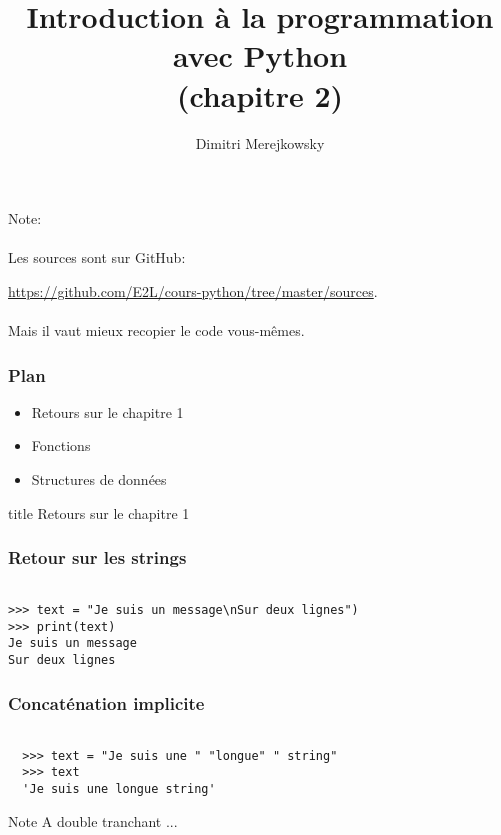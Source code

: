 \documentclass{beamer}
\title{Introduction à la programmation avec Python \\ (chapitre 2)}
\author{Dimitri Merejkowsky}
\institute{E2L}
\begin{document}
\begin{frame}

Note: \\~\\

Les sources sont sur GitHub:

\url{https://github.com/E2L/cours-python/tree/master/sources}. \\~\\


Mais il vaut mieux recopier le code vous-mêmes.

\end{frame}


\begin{frame}

\frametitle{Plan}

\begin{itemize}
  \item Retours sur le chapitre 1
  \item Fonctions
  \item Structures de données
\end{itemize}

\end{frame}

\begin{frame}[fragile]
  \centering
  \begin{beamercolorbox}[sep=8pt,center,shadow=true,rounded=true]{title}
    Retours sur le chapitre 1
  \end{beamercolorbox}
\end{frame}

\begin{frame}[fragile]
  \frametitle{Retour sur les strings}

\begin{lstlisting}

>>> text = "Je suis un message\nSur deux lignes")
>>> print(text)
Je suis un message
Sur deux lignes
\end{lstlisting}

\end{frame}

\begin{frame}[fragile]
  \frametitle{Concaténation implicite}

\begin{lstlisting}

  >>> text = "Je suis une " "longue" " string"
  >>> text
  'Je suis une longue string'
\end{lstlisting}

\begin{alertblock}{Note}
  A double tranchant ...
\end{alertblock}


\end{frame}
\end{document}
